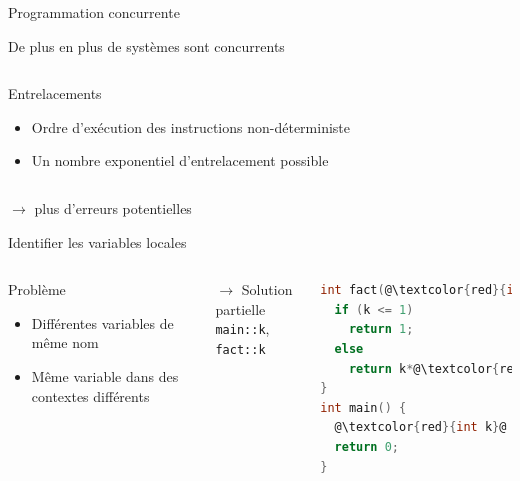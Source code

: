 \documentclass{beamer}
\begin{document}
\begin{frame}{Programmation concurrente}

  De plus en plus de systèmes sont concurrents
  \vspace{1em}

  \begin{columns}[onlytextwidth, T]
  \begin{alertblock}{Entrelacements}
    \begin{itemize}
    \setlength{\itemsep}{1.5em}
    \item Ordre d'exécution des instructions non-déterministe
    \item Un nombre exponentiel d'entrelacement possible
    \end{itemize}
  \end{alertblock}
  \end{columns}
  $\rightarrow$ \alert{plus d'erreurs potentielles}
\end{frame}

\begin{frame}[fragile]{Identifier les variables locales}
\begin{columns}[onlytextwidth, c]
  \begin{block}{Problème}
  \begin{itemize}
    \setlength{\itemsep}{1.5em}
    \item Différentes variables de même nom
    \item Même variable dans des contextes différents
  \end{itemize}
  \end{block}

  \vspace{3em}

  $\rightarrow$ Solution partielle\\
    \texttt{main::k}, \texttt{fact::k}

\begin{lstlisting}[language=C]
int fact(@\textcolor{red}{int k}@) {
  if (k <= 1)
    return 1;
  else
    return k*@\textcolor{red}{fact(k-1)}@;
}
int main() {
  @\textcolor{red}{int k}@ = fact(3);
  return 0;
}
\end{lstlisting}
\end{columns}
\end{frame}
\end{document}
